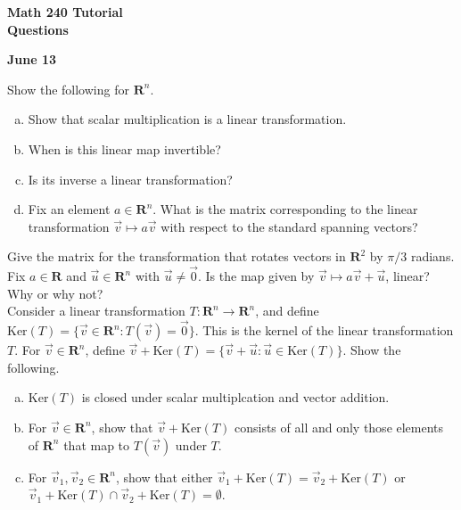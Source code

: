 \documentclass[a4paper,11pt]{article}
\newcommand{\R}{\mathbf{R}}
\begin{document}
\begin{center}
  {\Large\bfseries Math 240 Tutorial \\ Questions}
\end{center}
\begin{center}
  {\bfseries June 13}
\end{center}

 Show the following for $\R^n$.
\begin{enumerate}[(a)]
\item Show that scalar multiplication is a linear transformation.
\item When is this linear map invertible?
\item Is its inverse a linear transformation?
\item Fix an element $a \in \R^n$. What is the matrix corresponding to the
linear transformation $\vec v \mapsto a\vec v$ with respect to the standard
spanning vectors?
\end{enumerate}

 Give the matrix for the transformation that
rotates vectors in $\R^2$ by $\pi/3$ radians. \\

 Fix $a \in \R$ and $\vec u \in \R^n$ with $\vec
u \neq \vec 0$. Is the map given by $\vec v \mapsto a\vec v + \vec u$, linear?
Why or why not? \\

 Consider a linear transformation $T: \R^n
\rightarrow \R^n$, and define $\text{Ker}(T)=\{\vec v \in \R^n : T(\vec v)=\vec
0\}$. This is the kernel of the linear transformation $T$. For $\vec v \in
\R^n$, define $\vec v + \text{Ker}(T)=\{\vec v + \vec u : \vec u \in
\text{Ker}(T)\}$. Show the following.
\begin{enumerate}[(a)]
\item $\text{Ker}(T)$ is closed under scalar multiplcation and vector addition.
\item For $\vec v \in \R^n$, show that $\vec v + \text{Ker}(T)$ consists of all
  and only those elements of $\R^n$ that map to $T(\vec v)$ under $T$. \\
\item For $\vec v_1,\vec v_2 \in \R^n$, show that either $\vec
  v_1+\text{Ker}(T)=\vec v_2 +\text{Ker}(T)$ or $\vec v_1+\text{Ker}(T) \cap
  \vec v_2 +\text{Ker}(T)=\emptyset$. \\
\end{enumerate}
\end{document}
